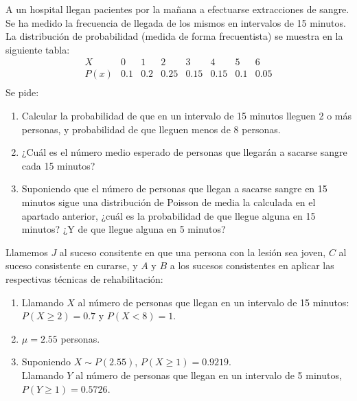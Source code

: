 {A un hospital llegan pacientes por la mañana a efectuarse extracciones de sangre. Se ha medido la frecuencia de llegada de los mismos en
intervalos de 15 minutos. La distribución de probabilidad (medida de forma frecuentista) se  muestra en la siguiente tabla:
\[
\begin{array}{c|c|c|c|c|c|c|c|}
  X   &  0  &  1  &  2   &  3   &  4   &  5  &  6   \\
\hline
 P(x) & 0.1 & 0.2 & 0.25 & 0.15 & 0.15 & 0.1 & 0.05 \\
\end{array}
\]
Se pide:
\begin{enumerate}
\item Calcular la probabilidad de que en un intervalo de 15 minutos lleguen 2 o más personas, y probabilidad de que lleguen menos de 8
personas.
\item ¿Cuál es el número medio esperado de personas que llegarán a sacarse sangre cada 15 minutos?
\item Suponiendo que el número de personas que llegan a sacarse sangre en 15 minutos sigue una distribución de Poisson de media la  
calculada en el apartado anterior, ¿cuál es la probabilidad de que llegue alguna en 15 minutos? ¿Y de que llegue alguna en 5 minutos? 
\end{enumerate}
} 
{Llamemos $J$ al suceso consitente en que una persona con la lesión sea joven, $C$ al suceso consistente en curarse, y $A$ y $B$ a los sucesos consistentes en aplicar las respectivas técnicas de
rehabilitación:
\begin{enumerate}
\item Llamando $X$ al número de personas que llegan en un intervalo de 15 minutos: $P(X\geq 2)=0.7$ y $P(X<8)=1$.
\item $\mu=2.55$ personas.
\item Suponiendo $X\sim P(2.55)$, $P(X\geq 1)=0.9219$.\\
Llamando $Y$ al número de personas que llegan en un intervalo de 5 minutos, $P(Y\geq 1)=0.5726$.
\end{enumerate}
}

